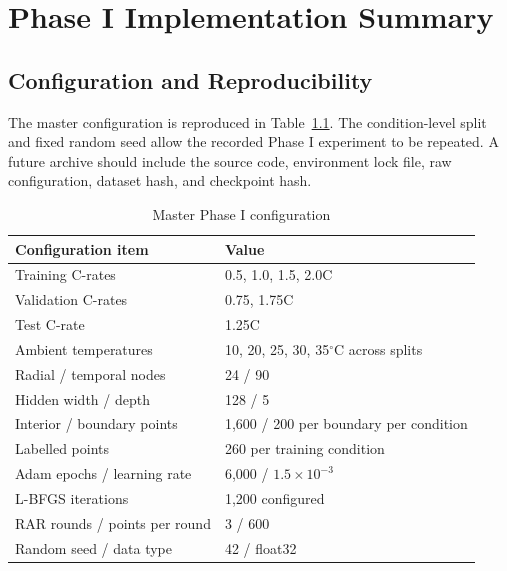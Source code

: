 \documentclass[14pt,a4paper,oneside]{extreport}
\renewcommand{\arraystretch}{1.25}
\begin{document}
\appendix
\chapter{Phase I Implementation Summary}
\label{app:implementation}
\section{Configuration and Reproducibility}
The master configuration is reproduced in Table~\ref{tab:appendixconfig}. The condition-level split and fixed random seed allow the recorded Phase I experiment to be repeated. A future archive should include the source code, environment lock file, raw configuration, dataset hash, and checkpoint hash.

\begingroup
\small
{}
\renewcommand{\arraystretch}{1.0}
\begin{longtable}{p{}p{}}
\caption{Master Phase I configuration}\label{tab:appendixconfig}\\
\toprule
Configuration item & Value\\
\midrule
Training C-rates & 0.5, 1.0, 1.5, 2.0C\\
Validation C-rates & 0.75, 1.75C\\
Test C-rate & 1.25C\\
Ambient temperatures & 10, 20, 25, 30, 35$^{\circ}$C across splits\\
Radial / temporal nodes & 24 / 90\\
Hidden width / depth & 128 / 5\\
Interior / boundary points & 1,600 / 200 per boundary per condition\\
Labelled points & 260 per training condition\\
Adam epochs / learning rate & 6,000 / $1.5\times10^{-3}$\\
L-BFGS iterations & 1,200 configured\\
RAR rounds / points per round & 3 / 600\\
Random seed / data type & 42 / float32\\
\bottomrule
\end{longtable}
\endgroup
\end{document}
